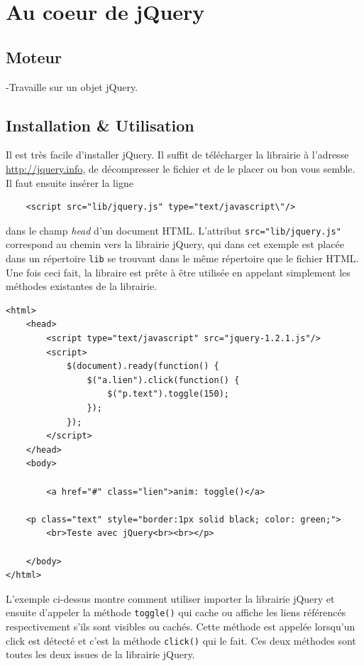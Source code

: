 \documentclass[10pt,a4paper,titlepage]{article}
\begin{document}
\newpage
\renewcommand{\labelitemi}{$\bullet$}
\section{Au coeur de jQuery}
\subsection{Moteur}
-Travaille sur un objet jQuery.

\subsection{Installation \& Utilisation}\label{install}
Il est très facile d'installer jQuery. Il suffit de télécharger la librairie à l'adresse \url{http://jquery.info}, de décompresser le fichier et de le placer ou bon vous semble. Il faut ensuite insérer la ligne
\begin{lstlisting}
	<script src="lib/jquery.js" type="text/javascript\"/>
\end{lstlisting}
dans le champ \emph{head} d'un document HTML. L'attribut \texttt{src="lib/jquery.js"} correspond au chemin vers la librairie jQuery, qui dans cet exemple est placée dans un répertoire \texttt{lib} se trouvant dans le même répertoire que le fichier HTML.\\

Une fois ceci fait, la libraire est prête à être utilisée en appelant simplement les méthodes existantes de la librairie.

\begin{lstlisting}
<html>
	<head>
		<script type="text/javascript" src="jquery-1.2.1.js"/>
		<script>
			$(document).ready(function() {		
				$("a.lien").click(function() {
					$("p.text").toggle(150);
				});
			});
		</script>
	</head>
	<body>

		<a href="#" class="lien">anim: toggle()</a>

	<p class="text" style="border:1px solid black; color: green;">
		<br>Teste avec jQuery<br><br></p>
		
	</body>
</html>
\end{lstlisting}

L'exemple ci-dessus montre comment utiliser importer la librairie jQuery et ensuite d'appeler la méthode \texttt{toggle()} qui cache ou affiche les liens référencés respectivement s'ils sont visibles ou cachés. Cette méthode est appelée lorsqu'un click est détecté et c'est la méthode \texttt{click()} qui le fait. Ces deux méthodes sont toutes les deux issues de la librairie jQuery.
\end{document}
